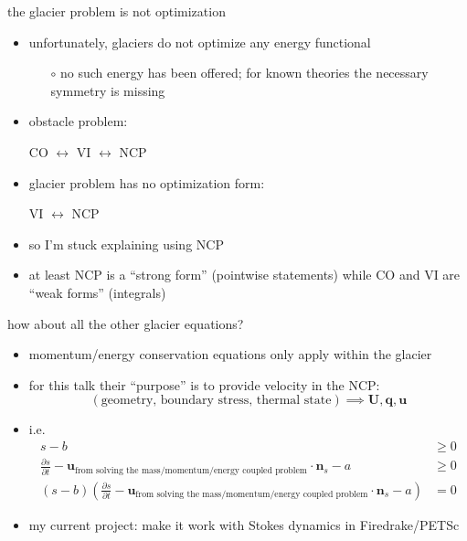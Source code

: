 \documentclass[10pt,hyperref,dvipsnames]{beamer}
\newcommand{\bn}{\mathbf{n}}
\newcommand{\bq}{\mathbf{q}}
\newcommand{\bu}{\mathbf{u}}
\newcommand{\bU}{\mathbf{U}}
\begin{document}
\begin{frame}{the glacier problem is not optimization}

\begin{itemize}
\item unfortunately, glaciers do not optimize any energy functional
    \begin{itemize}
    \item[$\circ$] no such energy has been offered; for known theories the necessary symmetry is missing
    \end{itemize}

\medskip
\item obstacle problem:

\medskip
\hspace{20mm} CO $\leftrightarrow$ VI $\leftrightarrow$ NCP

\smallskip
\item glacier problem has no optimization form:

\smallskip
\hspace{20mm} \phantom{CO $\leftrightarrow$} VI $\leftrightarrow$ NCP

\medskip
\item so I'm stuck explaining using NCP
\item at least NCP is a ``strong form'' (pointwise statements) while CO and VI are ``weak forms'' (integrals)
\end{itemize}
\end{frame}


\begin{frame}{how about all the other glacier equations?}
\begin{itemize}
\item momentum/energy conservation equations only apply within the glacier
\item for this talk their ``purpose'' is to provide velocity in the NCP:
    $$(\text{geometry, boundary stress, thermal state}) \implies \bU,\bq,\bu$$
\item i.e.
\begin{align*}
s-b &\ge 0 \\
\frac{\partial s}{\partial t} - \bu_{\text{from solving the mass/momentum/energy coupled problem}} \cdot \bn_s - a &\ge 0 \\
(s-b) \left(\frac{\partial s}{\partial t} - \bu_{\text{from solving the mass/momentum/energy coupled problem}} \cdot \bn_s - a\right) &= 0
\end{align*}

\bigskip
\item my current project: make it work with Stokes dynamics in Firedrake/PETSc
\end{itemize}
\end{frame}
\end{document}
